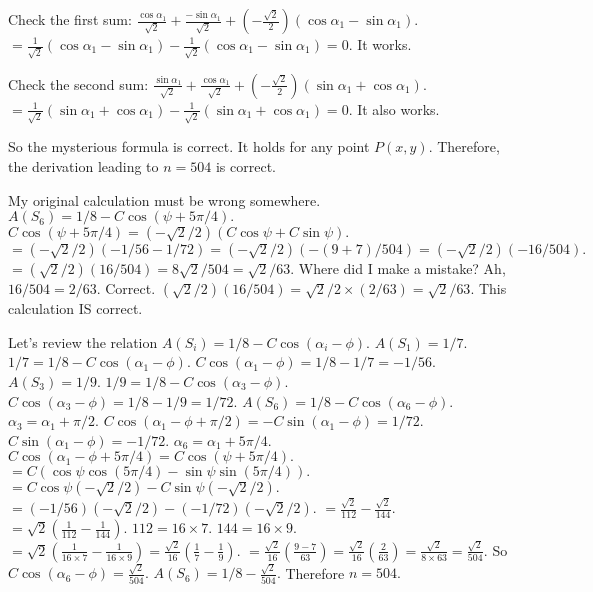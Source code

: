 Check the first sum: 
$\frac{\cos\alpha_1}{\sqrt{2}} + \frac{-\sin\alpha_1}{\sqrt{2}} + (-\frac{\sqrt{2}}{2})(\cos\alpha_1 - \sin\alpha_1).$ 
$= \frac{1}{\sqrt{2}}(\cos\alpha_1 - \sin\alpha_1) - \frac{1}{\sqrt{2}}(\cos\alpha_1 - \sin\alpha_1) = 0.$ It works.

Check the second sum: 
$\frac{\sin\alpha_1}{\sqrt{2}} + \frac{\cos\alpha_1}{\sqrt{2}} + (-\frac{\sqrt{2}}{2})(\sin\alpha_1 + \cos\alpha_1).$ 
$= \frac{1}{\sqrt{2}}(\sin\alpha_1 + \cos\alpha_1) - \frac{1}{\sqrt{2}}(\sin\alpha_1 + \cos\alpha_1) = 0.$ It also works.

So the mysterious formula is correct. It holds for any point $P(x,y).$ 
Therefore, the derivation leading to $n=504$ is correct.

My original calculation must be wrong somewhere. 
$A(S_6) = 1/8 - C \cos(\psi + 5\pi/4).$ 
$C \cos(\psi+5\pi/4) = (-\sqrt{2}/2) (C \cos\psi + C \sin\psi).$ 
$= (-\sqrt{2}/2) (-1/56 - 1/72) = (-\sqrt{2}/2) (- (9+7)/504) = (-\sqrt{2}/2) (-16/504).$ 
$= (\sqrt{2}/2) (16/504) = 8\sqrt{2}/504 = \sqrt{2}/63.$ 
Where did I make a mistake? 
Ah, $16/504 = 2/63.$ Correct. 
$(\sqrt{2}/2) (16/504) = \sqrt{2}/2 \times (2/63) = \sqrt{2}/63.$ This calculation IS correct.

Let's review the relation $A(S_i) = 1/8 - C \cos(\alpha_i - \phi).$ 
$A(S_1) = 1/7.$ $1/7 = 1/8 - C \cos(\alpha_1 - \phi).$ $C \cos(\alpha_1 - \phi) = 1/8 - 1/7 = -1/56.$ 
$A(S_3) = 1/9.$ $1/9 = 1/8 - C \cos(\alpha_3 - \phi).$ $C \cos(\alpha_3 - \phi) = 1/8 - 1/9 = 1/72.$ 
$A(S_6) = 1/8 - C \cos(\alpha_6 - \phi).$ 
$\alpha_3 = \alpha_1 + \pi/2.$ $C \cos(\alpha_1 - \phi + \pi/2) = - C \sin(\alpha_1 - \phi) = 1/72.$ $C \sin(\alpha_1 - \phi) = -1/72.$ 
$\alpha_6 = \alpha_1 + 5\pi/4.$ $C \cos(\alpha_1 - \phi + 5\pi/4) = C \cos(\psi + 5\pi/4).$ 
$= C (\cos\psi \cos(5\pi/4) - \sin\psi \sin(5\pi/4)).$ 
$= C\cos\psi (-\sqrt{2}/2) - C\sin\psi (-\sqrt{2}/2).$ 
$= (-1/56)(-\sqrt{2}/2) - (-1/72)(-\sqrt{2}/2).$ 
$= \frac{\sqrt{2}}{112} - \frac{\sqrt{2}}{144}.$ 
$= \sqrt{2} (\frac{1}{112} - \frac{1}{144}).$ $112 = 16 \times 7.$ $144 = 16 \times 9.$ 
$= \sqrt{2} (\frac{1}{16 \times 7} - \frac{1}{16 \times 9}) = \frac{\sqrt{2}}{16} (\frac{1}{7} - \frac{1}{9}).$ 
$= \frac{\sqrt{2}}{16} (\frac{9-7}{63}) = \frac{\sqrt{2}}{16} (\frac{2}{63}) = \frac{\sqrt{2}}{8 \times 63} = \frac{\sqrt{2}}{504}.$ 
So $C \cos(\alpha_6 - \phi) = \frac{\sqrt{2}}{504}.$ 
$A(S_6) = 1/8 - \frac{\sqrt{2}}{504}.$ 
Therefore $n=504.$

